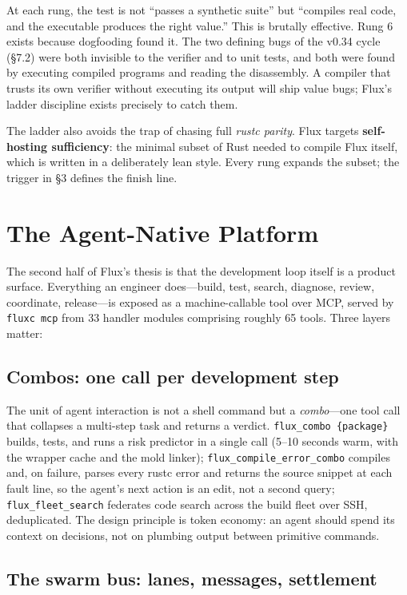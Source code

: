 At each rung, the test is not ``passes a synthetic suite'' but ``compiles real code, and the executable produces the right value.'' This is brutally effective. Rung 6 exists because dogfooding found it. The two defining bugs of the v0.34 cycle (\S7.2) were both invisible to the verifier and to unit tests, and both were found by executing compiled programs and reading the disassembly. A compiler that trusts its own verifier without executing its output will ship value bugs; Flux's ladder discipline exists precisely to catch them.

The ladder also avoids the trap of chasing full \emph{rustc parity}. Flux targets \textbf{self-hosting sufficiency}: the minimal subset of Rust needed to compile Flux itself, which is written in a deliberately lean style. Every rung expands the subset; the trigger in \S3 defines the finish line.


\section{The Agent-Native Platform}

The second half of Flux's thesis is that the development loop itself is a product surface. Everything an engineer does---build, test, search, diagnose, review, coordinate, release---is exposed as a machine-callable tool over MCP, served by \texttt{fluxc mcp} from 33 handler modules comprising roughly 65 tools. Three layers matter:

\subsection{Combos: one call per development step}

The unit of agent interaction is not a shell command but a \emph{combo}---one tool call that collapses a multi-step task and returns a verdict. \texttt{flux\_combo \{package\}} builds, tests, and runs a risk predictor in a single call (5--10 seconds warm, with the wrapper cache and the mold linker); \texttt{flux\_compile\_error\_combo} compiles and, on failure, parses every rustc error and returns the source snippet at each fault line, so the agent's next action is an edit, not a second query; \texttt{flux\_fleet\_search} federates code search across the build fleet over SSH, deduplicated. The design principle is token economy: an agent should spend its context on decisions, not on plumbing output between primitive commands.

\subsection{The swarm bus: lanes, messages, settlement}

